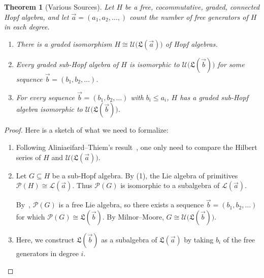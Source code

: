 \documentclass[11pt]{amsart}
\newtheorem{thm}{Theorem}
\theoremstyle{definition}
\numberwithin{equation}{section}
\newcommand{\lucas}[1]{\todo[size=\tiny,color=red]{#1 \\ \hfill --- Lucas}}
\begin{document}
\begin{thm}[Various Sources]
Let $H$ be a free, cocommutative, graded, connected Hopf algebra, and let $\vec{a} = (a_{1}, a_{2}, \ldots, )$ count the number of free generators of $H$ in each degree.  
\begin{enumerate}
\item There is a graded isomorphism $H \cong \mathcal{U}\big(\mathfrak{L}(\vec{a})\big)$ of Hopf algebras.

\item Every graded sub-Hopf algebra of $H$ is isomorphic to $\mathcal{U}\big(\mathfrak{L}(\vec{b})\big)$ for some sequence $\vec{b} = (b_{1}, b_{2}, \ldots)$.

\item For every sequence $\vec{b} = (b_{1}, b_{2}, \ldots)$ with $b_{i} \le a_{i}$, $H$ has a graded sub-Hopf algebra isomorphic to $\mathcal{U}\big(\mathfrak{L}(\vec{b})\big)$.

\end{enumerate}
\end{thm}
\begin{proof}
Here is a sketch of what we need to formalize:
\begin{enumerate}
\item %

Following Aliniaeifard--Thiem's result~\cite[Theorem 4.2]{AT22}, one only need to compare the Hilbert series of $H$ and $\mathcal{U}\big(\mathfrak{L}(\vec{a})\big)$.


\item Let $G \subseteq H$ be a sub-Hopf algebra.  By (1), the Lie algebra of primitives $\mathcal{P}(H) \cong \mathcal{L}(\vec{a})$.  Thus $\mathcal{P}(G)$ is isomorphic to a subalgebra of $\mathcal{L}(\vec{a})$.  

By~\cite[Theorem 2.2]{MSZ}, $\mathcal{P}(G)$ is a free Lie algebra, so there exists a sequence $\vec{b} = (b_{1}, b_{2}, \ldots)$ for which $\mathcal{P}(G) \cong \mathfrak{L}(\vec{b})$.
By Milnor--Moore, $G \cong \mathcal{U}\big(\mathfrak{L}(\vec{b})\big)$.


\item Here, we construct $\mathfrak{L}(\vec{b})$ as a subalgebra of $\mathfrak{L}(\vec{a})$ by taking $b_{i}$ of the free generators in degree $i$.
\end{enumerate}
\end{proof}
\end{document}
